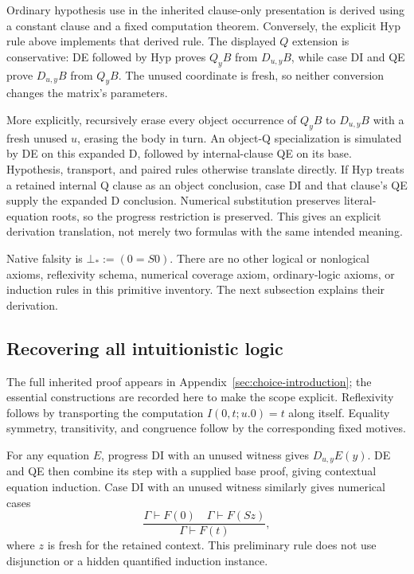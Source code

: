 \documentclass[11pt,letterpaper]{article}
\theoremstyle{definition}\newtheorem{definition}[theorem]{Definition}
\theoremstyle{remark}\newtheorem{remark}[theorem]{Remark}
\begin{document}
Ordinary hypothesis use in the inherited clause-only presentation is
derived using a constant clause and a fixed computation theorem.
Conversely, the explicit Hyp rule above implements that derived rule.
The displayed $Q$ extension is conservative: DE followed by Hyp
proves $Q_yB$ from $D_{u,y}B$, while case DI and QE prove
$D_{u,y}B$ from $Q_yB$. The unused coordinate is fresh, so neither
conversion changes the matrix's parameters.

More explicitly, recursively erase every object occurrence of $Q_yB$
to $D_{u,y}B$ with a fresh unused $u$, erasing the body in turn.
An object-Q specialization is simulated by DE on this expanded D,
followed by internal-clause QE on its base. Hypothesis, transport,
and paired rules otherwise translate directly. If Hyp treats a
retained internal Q clause as an object conclusion, case DI and
that clause's QE supply the expanded D conclusion. Numerical
substitution preserves literal-equation roots, so the progress
restriction is preserved. This gives an explicit derivation
translation, not merely two formulas with the same intended meaning.

Native falsity is $\bot_*:=(0=S0)$. There are no other logical or
nonlogical axioms, reflexivity schema, numerical coverage axiom,
ordinary-logic axioms, or induction rules in this primitive inventory.
The next subsection explains their derivation.

\subsection{Recovering all intuitionistic logic}

The full inherited proof appears in Appendix~\ref{sec:choice-introduction};
the essential constructions are recorded here to make the scope explicit.
Reflexivity follows by transporting the computation
$I(0,t;u.0)=t$ along itself. Equality symmetry, transitivity, and
congruence follow by the corresponding fixed motives.

For any equation $E$, progress DI with an unused witness gives
$D_{u,y}E(y)$. DE and QE then combine its step with a supplied
base proof, giving contextual equation induction. Case DI with
an unused witness similarly gives numerical cases
\[
 \frac{\Gamma\vdash F(0)\quad\Gamma\vdash F(Sz)}
      {\Gamma\vdash F(t)},
\]
where $z$ is fresh for the retained context. This preliminary rule
does not use disjunction or a hidden quantified induction instance.
\end{document}
